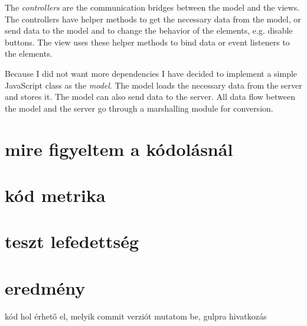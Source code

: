 The \emph{controllers} are the communication bridges between the model and the views. The controllers have helper methods to get the necessary data from the model, or send data to the model and to change the behavior of the elements, e.g. disable buttons. The view uses these helper methods to bind data or event listeners to the elements.

Because I did not want more dependencies I have decided to implement a simple JavaScript class as the \emph{model}. The model loads the necessary data from the server and stores it. The model can also send data to the server. All data flow between the model and the server go through a marshalling module for conversion.


\section{mire figyeltem a kódolásnál}
\section{kód metrika}
\section{teszt lefedettség}
\section{eredmény}
kód hol érhető el, melyik commit verziót mutatom be, gulpra hivatkozás